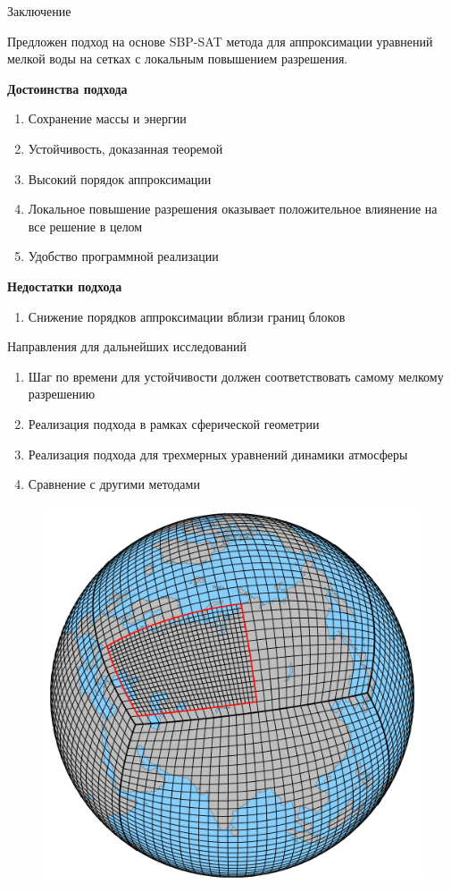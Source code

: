 \documentclass[10pt]{beamer}
\begin{document}
\begin{frame}{Заключение}

Предложен подход на основе SBP-SAT метода для аппроксимации уравнений мелкой воды на сетках с локальным повышением разрешения.

\textbf{Достоинства подхода}
\begin{enumerate}
\item Сохранение массы и энергии
\item Устойчивость, доказанная теоремой
\item Высокий порядок аппроксимации
\item Локальное повышение разрешения оказывает положительное влиянение на все решение в целом
\item Удобство программной реализации
\end{enumerate}

\textbf{Недостатки подхода}
\begin{enumerate}

\item Снижение порядков аппроксимации вблизи границ блоков
\end{enumerate}

\end{frame}

\begin{frame}{Направления для дальнейших исследований}

\begin{enumerate}
\item Шаг по времени для устойчивости должен соответствовать самому мелкому разрешению
\item Реализация подхода в рамках сферической геометрии
\item Реализация подхода для трехмерных уравнений динамики атмосферы
\item Сравнение с другими методами

\end{enumerate}

\end{frame}

\begin{frame}
\begin{figure}[h]
\centering
\includegraphics[width=0.4\linewidth]{./images/cubsphere.png}
\end{figure}
\end{frame}
\end{document}
